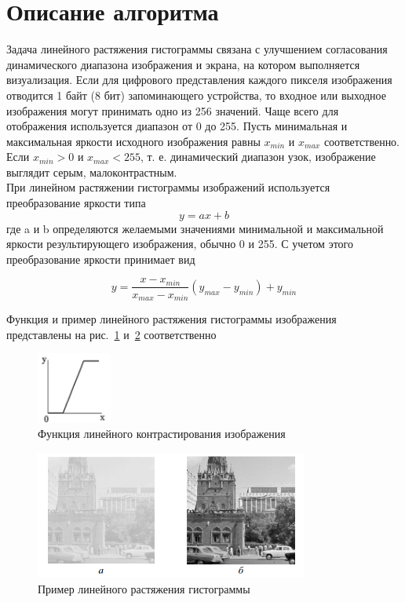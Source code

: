 \documentclass[a4paper,12pt]{article}
\begin{document}
\section*{Описание алгоритма}

Задача линейного растяжения гистограммы связана с улучшением согласования динамического диапазона изображения и экрана, на котором выполняется визуализация. Если для цифрового представления каждого пикселя изображения отводится 1 байт (8 бит) запоминающего устройства, то входное или выходное изображения могут принимать одно из 256 значений. Чаще всего для отображения используется диапазон от 0 до 255. Пусть минимальная и максимальная яркости исходного изображения равны $x_{min}$ и $x_{max}$ соответственно. Если $x_{min} > 0$ и $x_{max} < 255$, т. е. динамический диапазон узок, изображение выглядит серым, малоконтрастным.\\

При линейном растяжении гистограммы изображений используется преобразование яркости типа 
\begin{equation}\label{formula}
y = ax + b
\end{equation}
где a и b определяются желаемыми значениями минимальной и максимальной яркости результирующего изображения, обычно 0 и 255. С учетом этого преобразование яркости принимает вид 

\begin{equation}\label{formulaLinStreach}
y = \frac{x - x_{min}}{x_{max} - x_{min}}(y_{max} - y_{min}) + y_{min}
\end{equation}

Функция и пример линейного растяжения гистограммы изображения представлены на рис.~\ref{fig:funcLinStreach} и~\ref{fig:exampleLinStreach} соответственно

\begin{figure}[h!]
\centering
\includegraphics[width=0.22\textwidth]{images/funcLinStreach.png}
\caption{Функция линейного контрастирования изображения}
\label{fig:funcLinStreach}
\end{figure}

\begin{figure}[h!]
\centering
\includegraphics[width=0.8\textwidth]{images/linStreachExample.png}
\caption{ Пример линейного растяжения гистограммы}
\label{fig:exampleLinStreach}
\end{figure}
\end{document}
